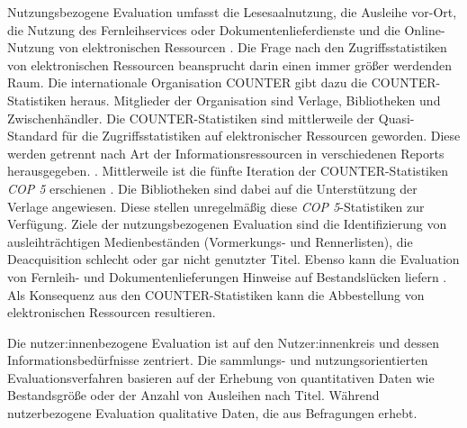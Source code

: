 Nutzungsbezogene Evaluation umfasst die Lesesaalnutzung, die Ausleihe vor-Ort, die Nutzung des Fernleihservices oder Dokumentenlieferdienste und die Online-Nutzung von elektronischen Ressourcen \cite[Vgl.][254 ff.]{johannsen_jochen_bestands-_2015}.
Die Frage nach den Zugriffsstatistiken von elektronischen Ressourcen beansprucht darin einen immer größer werdenden Raum.
Die internationale Organisation \acrfull{COUNTER} gibt dazu die COUNTER-Statistiken heraus. Mitglieder der Organisation sind Verlage, Bibliotheken
und Zwischenhändler. Die COUNTER-Statistiken sind mittlerweile der Quasi-Standard für die Zugriffsstatistiken 
auf elektronischer Ressourcen geworden. Diese werden getrennt nach Art der Informationsressourcen in verschiedenen Reports herausgegeben. \cite[Vgl.][260 ff.]{johannsen_jochen_bestands-_2015}. 
Mittlerweile ist die fünfte Iteration der COUNTER-Statistiken \textit{\acrshort{COP 5}} erschienen \cite{counter_abstract_2020}.
Die Bibliotheken sind dabei auf die Unterstützung der Verlage angewiesen. Diese stellen unregelmäßig diese \textit{\acrshort{COP 5}}-Statistiken zur
Verfügung. Ziele der nutzungsbezogenen Evaluation sind die Identifizierung von ausleihträchtigen Medienbeständen (Vormerkungs- und Rennerlisten), 
die Deacquisition schlecht oder gar nicht genutzter Titel. Ebenso kann die Evaluation von Fernleih- und Dokumentenlieferungen Hinweise auf Bestandslücken liefern
\cite[Vgl.][255 ff.]{johannsen_jochen_bestands-_2015}. Als Konsequenz aus den COUNTER-Statistiken kann die Abbestellung von elektronischen Ressourcen resultieren.

Die nutzer:innenbezogene Evaluation ist auf den Nutzer:innenkreis und dessen Informationsbedürfnisse zentriert. 
Die sammlungs- und nutzungsorientierten Evaluationsverfahren basieren auf der Erhebung von quantitativen Daten wie Bestandsgröße oder der Anzahl von Ausleihen nach Titel. 
Während nutzerbezogene Evaluation qualitative Daten, die aus Befragungen erhebt.

